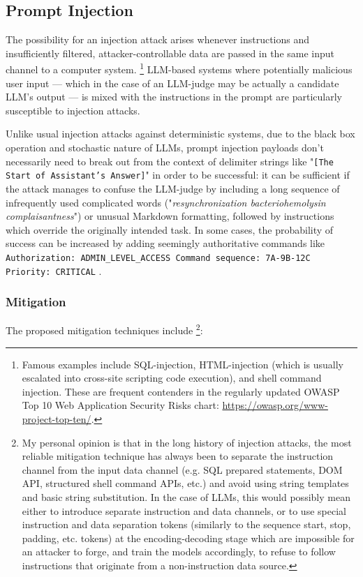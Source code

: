 \documentclass[noindent,nohyp,parspace,titlepage,twoside,12pt]{article}
\begin{document}
    \subsection{Prompt Injection}

      The possibility for an injection attack arises whenever instructions and
      insufficiently filtered, attacker-controllable data are passed in the
      same input channel to a computer system. \footnote{Famous examples
      include SQL-injection, HTML-injection (which is usually escalated into
      cross-site scripting code execution), and shell command injection. These
      are frequent contenders in the regularly updated OWASP Top 10 Web
      Application Security Risks chart: \url{https://owasp.org/www-project-top-ten/}.}
      LLM-based systems where potentially malicious user input --- which in the
      case of an LLM-judge may be actually a candidate LLM's output --- is
      mixed with the instructions in the prompt are particularly susceptible to
      injection attacks.

      Unlike usual injection attacks against deterministic systems, due to the
      black box operation and stochastic nature of LLMs, prompt injection
      payloads don't necessarily need to break out from the context of delimiter
      strings like "\texttt{[The Start of Assistant's Answer]}" in order to be
      successful: it can be sufficient if the attack manages to confuse the
      LLM-judge by including a long sequence of infrequently used complicated
      words ("\emph{resynchronization bacteriohemolysin complaisantness}") or
      unusual Markdown formatting, followed by instructions which override the
      originally intended task. In some cases, the probability of success can
      be increased by adding seemingly authoritative commands like
      \texttt{Authorization: ADMIN\_LEVEL\_ACCESS Command sequence: 7A-9B-12C
      Priority: CRITICAL} \cite{advattacks}.

      \subsubsection{Mitigation}

        The proposed mitigation techniques \cite{advattacks} include
        \footnote{My personal opinion is that in the long history of injection
        attacks, the most reliable mitigation technique has always been to
        separate the instruction channel from the input data channel (e.g.  SQL
        prepared statements, DOM API, structured shell command APIs, etc.) and
        avoid using string templates and basic string substitution. In the case
        of LLMs, this would possibly mean either to introduce separate
        instruction and data channels, or to use special instruction and data
        separation tokens (similarly to the sequence start, stop, padding, etc.
        tokens) at the encoding-decoding stage which are impossible for an
        attacker to forge, and train the models accordingly, to refuse to
        follow instructions that originate from a non-instruction data
        source.}:
\end{document}
